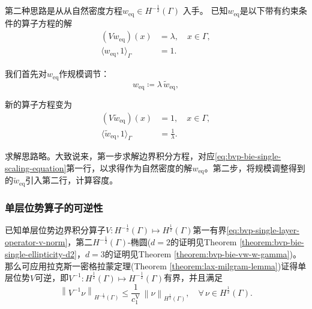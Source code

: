第二种思路是从从自然密度方程$w_{\text{eq}} \in H^{-\frac{1}{2}}(\Gamma)$
\label{sec:bvp-bie-single-ellipticity-natural-density-approach}入手。
已知$w_{\text{eq}}$是以下带有约束条件的算子方程的解
\begin{equation*}
  \begin{split}
    \left(
    V w_{\text{eq}}
    \right) (x) &= \lambda, \quad x \in \Gamma, \\
    \langle w_{\text{eq}}, 1 \rangle_{\Gamma} &= 1.
  \end{split}
\end{equation*}

我们首先对$w_{\text{eq}}$作规模调节：
\begin{equation*}
  w_{\text{eq}} \coloneqq \lambda \, \widetilde{w}_{\text{eq}},
\end{equation*}

新的算子方程变为
\begin{equation}
  \label{eq:bvp-bie-single-scaling-equation}
  \begin{split}
    \left(
    V \widetilde{w}_{\text{eq}}
    \right) (x) &= 1, \quad x \in \Gamma, \\
    \langle \widetilde{w}_{\text{eq}}, 1 \rangle_{\Gamma} &= \frac{1}{\lambda}.
  \end{split}
\end{equation}

求解思路略。大致说来，第一步求解边界积分方程，对应\eqref{eq:bvp-bie-single-scaling-equation}第一行，以求得作为自然密度的解$w_{\text{eq}}$。第二步，将规模调整得到的$\widetilde{w}_{\text{eq}}$引入第二行，计算容度。

\subsubsection{单层位势算子的可逆性}
\label{sec:bvp-bie-single-invertibility}
已知单层位势边界积分算子$V:H^{-\frac{1}{2}}(\Gamma) \mapsto H^{\frac{1}{2}}(\Gamma)$第一有界\eqref{eq:bvp-single-layer-operator-v-norm}，第二$H^{-\frac{1}{2}}(\Gamma)$-椭圆($d=2$的证明见Theorem \ref{theorem:bvp-bie-single-ellipticity-d2}，$d=3$的证明见Theorem \ref{theorem:bvp-bie-vw-w-gamma})。那么可应用拉克斯一密格拉蒙定理(Theorem \ref{theorem:lax-milgram-lemma})证得单层位势$V$可逆，即$V^{-1}:H^{\frac{1}{2}}(\Gamma) \mapsto H^{-\frac{1}{2}}(\Gamma)$有界，并且满足
\begin{equation*}
  \left\| V^{-1} \nu \right\|_{H^{-\frac{1}{2}}(\Gamma)}
  \le \frac{1}{c_{1}^{\text{V}}} \, \left\| \nu \right\|_{H^{\frac{1}{2}}(\Gamma)}, \quad \forall \, \nu \in H^{\frac{1}{2}}(\Gamma).
\end{equation*}

